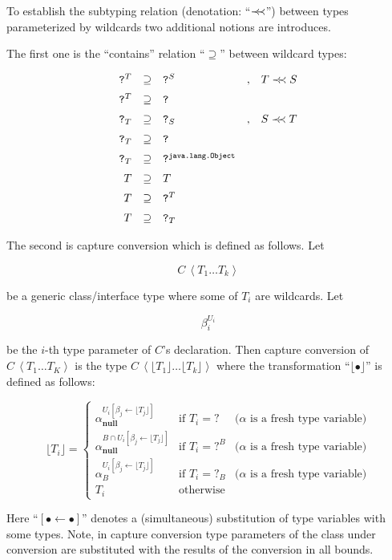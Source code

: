\documentclass{article}
\newcommand{\precprec}{\prec\mathrel{\mkern-5mu}\prec}
\newcommand{\grc}[2]{{#1}\,\left<{#2}\right>}
\newcommand{\java}[1]{\texttt{#1}}
\newcommand{\primi}[1]{\mathbf{#1}}
\newcommand{\cc}[1]{\lfloor{#1}\rfloor}
\begin{document}
To establish the subtyping relation (denotation: ``$\precprec$'') between types parameterized by wildcards two additional
notions are introduces.

The first one is the ``contains'' relation ``$\supseteq$'' between wildcard types:

\[
\begin{array}{rclcl}
  \java{?}^T&\supseteq&\java{?}^S&,&T\precprec S \\[2mm]
  \java{?}^T&\supseteq&\java{?}&& \\[2mm]
  \java{?}_T&\supseteq&\java{?}_S&,&S\precprec T\\[2mm]
  \java{?}_T&\supseteq&\java{?}&& \\[2mm]
  \java{?}_T&\supseteq&\java{?}^\java{java.lang.Object}&& \\[2mm]
  T&\supseteq& T&&\\[2mm]
  T&\supseteq&\java{?}^T&&\\[2mm]
  T&\supseteq&\java{?}_T&&
\end{array}
\]

The second is capture conversion which is defined as follows. Let

\[
\grc{C}{T_1\dots T_k}
\]

be a generic class/interface type where some of $T_i$ are wildcards. Let

\[
\beta_i^{U_i}
\]

be the $i$-th type parameter of $C$'s declaration. Then capture conversion of
$\grc{C}{T_1\dots T_K}$ is the type $\grc{C}{\cc{T_1}\dots \cc{T_k}}$ where the transformation
``$\cc{\bullet}$'' is defined as follows:

\[
\cc{T_i}=\left\{
\begin{array}{lll}  
  \alpha^{U_i[\beta_j\gets \cc{T_j}]}_\primi{null}      &\mbox{if }        T_i=\java{?}  &\mbox{($\alpha$ is a fresh type variable)}\\[5mm]
  \alpha^{B\cap U_i[\beta_j\gets \cc{T_j}]}_\primi{null} &\mbox{if }        T_i=\java{?}^B &\mbox{($\alpha$ is a fresh type variable)}\\[5mm]
  \alpha^{U_i[\beta_j\gets \cc{T_j}]}_B               &\mbox{if }        T_i=\java{?}_B &\mbox{($\alpha$ is a fresh type variable)}\\[5mm]
  T_i                                           &\mbox{otherwise}  & 
\end{array}\right.
\]

Here ``$[\bullet\gets\bullet]$'' denotes a (simultaneous) substitution of type variables with some types. Note, in capture conversion
type parameters of the class under conversion are substituted with the results of the conversion in all bounds.
\end{document}
